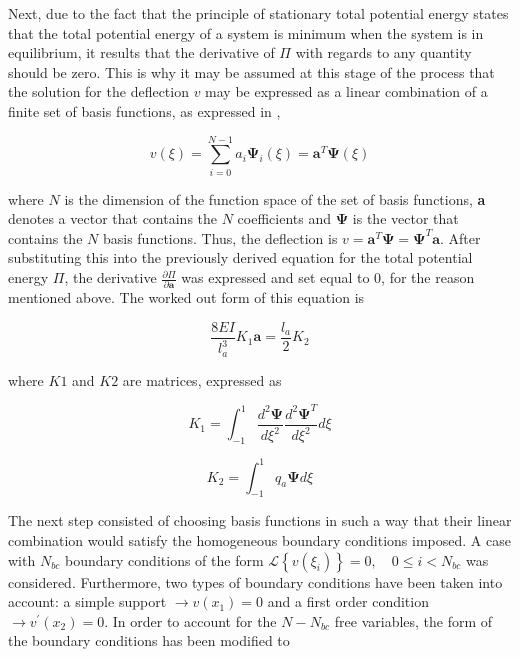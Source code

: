 \noindent Next, due to the fact that the principle of stationary total potential energy states that the total potential energy of a system is minimum when the system is in equilibrium, it results that the derivative of $\Pi$ with regards to any quantity should be zero. This is why it may be assumed at this stage of the process that the solution for the deflection $v$ may be expressed as a linear combination of a finite set of basis functions, as expressed in ,

\begin{equation}
\label{eq:basis_functions}
    v(\xi)=\sum_{i=0}^{N-1} a_{i} \mathbf{\Psi}_{i}(\xi)=\mathbf{a}^{T} \mathbf{\Psi}(\xi)
\end{equation}

\noindent where $N$ is the dimension of the function space of the set of basis functions, \textbf{a} denotes a vector that contains the $N$ coefficients and $\mathbf{\Psi}$ is the vector that contains the $N$ basis functions. Thus, the deflection is $v=\mathbf{a}^{T} \boldsymbol{\Psi}=\boldsymbol{\Psi}^{T} \mathbf{a}$. After substituting this into the previously derived equation for the total potential energy $\Pi$, the derivative $\frac{\partial \Pi}{\partial \mathbf{a}}$ was expressed and set equal to 0, for the reason mentioned above. The worked out form of this equation is 

\begin{equation}
\label{eq:derivative}
    \frac{8 E I}{l_{a}^{3}} K_{1} \mathbf{a}=\frac{l_{a}}{2} K_{2}
\end{equation}

\noindent where $K1$ and $K2$ are matrices, expressed as

\begin{equation}
\label{eq:K1}
    K_{1}=\int_{-1}^{1} \frac{d^{2} \mathbf{\Psi}}{d \xi^{2}} \frac{d^{2} \mathbf{\Psi}^{T}}{d \xi^{2}} d \xi
\end{equation}

\begin{equation}
\label{eq:K2}
   K_{2}=\int_{-1}^{1} q_{a} \mathbf{\Psi} d \xi
\end{equation}

\noindent The next step consisted of choosing basis functions in such a way that their linear combination would satisfy the homogeneous boundary conditions imposed. A case with $N_{bc}$ boundary conditions of the form $\mathcal{L}\left\{v\left(\xi_{i}\right)\right\}=0, \quad 0 \leq i<N_{b c}$ was considered. Furthermore, two types of boundary conditions have been taken into account: a simple support $\rightarrow v\left(x_{1}\right)=0$ and a first order condition $\rightarrow v^{\prime}\left(x_{2}\right)=0$. In order to account for the $N-N_{bc}$ free variables, the form of the boundary conditions has been modified to

